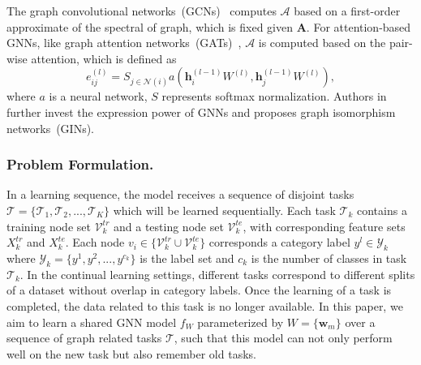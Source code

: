 \documentclass[letterpaper]{article} %
\begin{document}
The graph convolutional networks~(GCNs)~\cite{kipf2016semi} 
computes $\mathcal{A}$ based on 
a first-order approximate of the spectral of graph, which is fixed
given $\boldsymbol{A}$.
For attention-based GNNs, 
like graph attention networks~(GATs)~\cite{velivckovic2017graph}, 
$\mathcal{A}$ is computed based on the pair-wise attention,
which is defined as
\begin{equation}
\label{eij}
  e_{ij}^{(l)}=S_{j \in \mathcal{N}(i)} a(\boldsymbol{h}_i^{(l-1)} W^{(l)},\boldsymbol{h}_j^{(l-1)} W^{(l)}),
\end{equation}
\noindent where $a$ is a neural network, $S$ represents softmax normalization.
Authors in~\cite{xu2018powerful} further invest the expression power of GNNs
and proposes graph isomorphism networks~(GINs).


\subsubsection{Problem Formulation.}
In a learning sequence, the model
receives a sequence of disjoint tasks
$\mathcal{T}=\{\mathcal{T}_1,\mathcal{T}_2,...,\mathcal{T}_K\}$ which will be learned sequentially. 
Each task $\mathcal{T}_k$ contains a training node set $\mathcal{V}_k^{tr}$ and a testing node set $\mathcal{V}_k^{te}$, with corresponding feature sets $X_k^{tr}$ and $X_k^{te}$.
Each node $v_i \in \{\mathcal{V}_k^{tr} \cup \mathcal{V}_k^{te} \}$ corresponds a category label $y^l \in \mathcal{Y}_k$ where $\mathcal{Y}_k = \{y^1, y^2,...,y^{c_k} \}$ is the label set and $c_k$ is the number of classes in task $\mathcal{T}_k$. 
In the continual learning settings, different tasks correspond to different splits of a dataset without overlap in category labels.
Once the learning of a task is completed, the data related to this task is no longer available.
In this paper, we aim to learn a shared GNN model $f_W$ parameterized by $W=\{\boldsymbol{w}_m\}$ over a sequence of graph related tasks $\mathcal{T}$,  %
such that this model can not only perform well on the new task but also remember old tasks.
\end{document}
